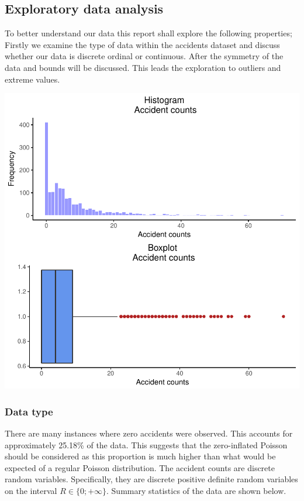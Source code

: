 \documentclass[11pt,preprint, authoryear]{elsarticle}
\numberwithin{equation}{section}
\numberwithin{figure}{section}
\numberwithin{table}{section}
\begin{document}
\subsection{Exploratory data analysis}\label{exploratory-data-analysis}

To better understand our data this report shall explore the following
properties; Firstly we examine the type of data within the accidents
dataset and discuss whether our data is discrete ordinal or continuous.
After the symmetry of the data and bounds will be discussed. This leads
the exploration to outliers and extreme values.

\includegraphics{likelihood_files/figure-latex/unnamed-chunk-1-1.pdf}

\subsubsection{Data type}\label{data-type}

There are many instances where zero accidents were observed. This
accounts for approximately 25.18\% of the data. This suggests that the
zero-inflated Poisson should be considered as this proportion is much
higher than what would be expected of a regular Poisson distribution.
The accident counts are discrete random variables. Specifically, they
are discrete positive definite random variables on the interval
\(R \in \{0;+ \infty\}\). Summary statistics of the data are shown
below.
\end{document}
